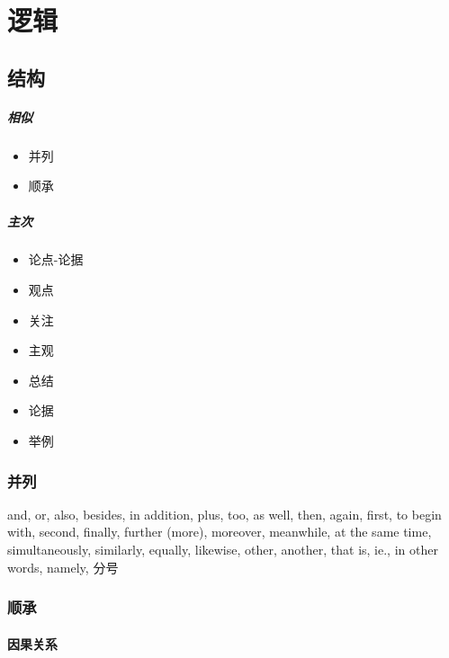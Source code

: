 \chapter{逻辑}

\section{结构}

  \begin{multicols}{2}
    \paragraph{相似}
    \begin{itemize}
      \item 并列
      \item 顺承
    \end{itemize}

    \paragraph{主次}
    \begin{itemize}
      \item 论点-论据
      \item 观点
      \item 关注
      \item 主观
      \item 总结
      \item 论据
      \item 举例
    \end{itemize}
  \end{multicols}

  \subsection{并列}

    and, or, also, besides, in addition, plus, too, as well, then, again, first,
    to begin with, second, finally, further (more), moreover, meanwhile,
    at the same time, simultaneously, similarly, equally, likewise, other,
    another, that is, ie., in other words, namely, 分号

  \subsection{顺承}

    \subsubsection{因果关系}

